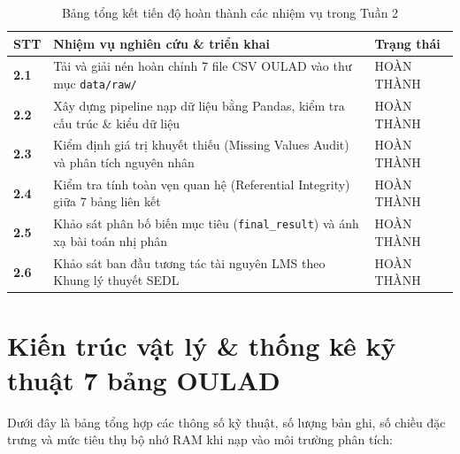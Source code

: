 \documentclass[11pt,a4paper]{article}
\begin{document}
\begin{table}[H]
\centering
\small
\renewcommand{\arraystretch}{1.3}
\begin{tabularx}{\textwidth}{@{}>{\centering\arraybackslash}p{1.2cm} X >{\centering\arraybackslash}p{3cm}@{}}
\toprule
\textbf{STT} & \textbf{Nhiệm vụ nghiên cứu \& triển khai} & \textbf{Trạng thái} \\
\midrule
\textbf{2.1} & Tải và giải nén hoàn chỉnh 7 file CSV OULAD vào thư mục \texttt{data/raw/} & HOÀN THÀNH \\
\textbf{2.2} & Xây dựng pipeline nạp dữ liệu bằng Pandas, kiểm tra cấu trúc \& kiểu dữ liệu & HOÀN THÀNH \\
\textbf{2.3} & Kiểm định giá trị khuyết thiếu (Missing Values Audit) và phân tích nguyên nhân & HOÀN THÀNH \\
\textbf{2.4} & Kiểm tra tính toàn vẹn quan hệ (Referential Integrity) giữa 7 bảng liên kết & HOÀN THÀNH \\
\textbf{2.5} & Khảo sát phân bố biến mục tiêu (\texttt{final\_result}) và ánh xạ bài toán nhị phân & HOÀN THÀNH \\
\textbf{2.6} & Khảo sát ban đầu tương tác tài nguyên LMS theo Khung lý thuyết SEDL & HOÀN THÀNH \\
\bottomrule
\end{tabularx}
\caption{Bảng tổng kết tiến độ hoàn thành các nhiệm vụ trong Tuần 2}
\end{table}

\section{Kiến trúc vật lý \& thống kê kỹ thuật 7 bảng OULAD}


Dưới đây là bảng tổng hợp các thông số kỹ thuật, số lượng bản ghi, số chiều đặc trưng và mức tiêu thụ bộ nhớ RAM khi nạp vào môi trường phân tích:
\end{document}
